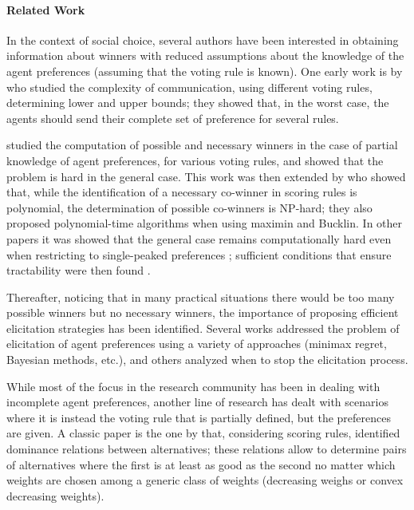 \documentclass{article}
\begin{document}
\paragraph{Related Work}
\label{sec:related}
In the context of social choice, several authors have been interested in obtaining information about winners with reduced assumptions about the knowledge of the agent preferences (assuming that the voting rule is known). One early work is  by  who studied the complexity of communication, using different voting rules, determining lower and upper bounds; they showed that, in the worst case, the agents should send their complete set of preference for several rules. 

 studied the computation of possible and necessary winners in the case of partial knowledge of agent preferences, for various voting rules, and showed that the problem is hard in the general case.
This work was then extended by \citet{Xia2008} who showed that, while the identification of a necessary co-winner in scoring rules is polynomial,  the determination of possible co-winners is NP-hard; they also  proposed polynomial-time algorithms when using maximin and Bucklin.
In other papers it was showed that the general case remains computationally hard even when restricting to single-peaked preferences \citep{Walsh2007};  sufficient conditions that ensure tractability were then found \citep{Pini2007}.


Thereafter, noticing that in many practical situations there would be too many possible winners but no necessary winners, the importance of proposing efficient elicitation strategies has been identified. 
Several works addressed the problem of  elicitation of agent preferences \citep{Naamani-Dery2015,Kalech2011,Lu2011,Pini2009,Benabbou2016,Dey2016,Dey2016_2} using a variety of approaches (minimax regret, Bayesian methods, etc.), and others \citep{Walsh2009,Conitzer2009}  analyzed when to stop the elicitation process.

While most of the focus in the research community has been in dealing with incomplete agent preferences, 
another line of research has dealt with scenarios where it is instead the voting rule that is partially defined, but the preferences are given. 
A classic paper is the one by \citet{Stein1994} that, considering scoring rules, identified dominance relations between alternatives; these relations allow to determine pairs of alternatives where the first is at least as good as the second no matter which weights are chosen among a generic class of weights (decreasing weighs or convex decreasing weights).
\end{document}
